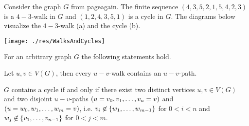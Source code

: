 \begin{exam}
Consider the graph $G$ from page\pageref{ex:Graph}again. The finite sequence $(4, 3, 5, 2, 1, 5, 4, 2, 3)$ is a $4-3$-walk in $G$ and $(1,2,4,3,5,1)$ is a cycle in $G$. The diagrams below visualize the $4-3$-walk (a) and the cycle (b).

\begin{center}
\texttt{[image: ./res/WalksAndCycles]}
%     
%     
%     
\end{center}
\end{exam}
\begin{lem} For an arbitrary graph $G$ the following statements hold. \label{thm:Unique Paths}
\begin{thmlist}
\item Let $u,v\in V(G)$, then every $u-v$-walk contains an $u-v$-path.\label{thm:Every walk contains a trail}
\item $G$ contains a cycle if and only if there exist two distinct vertices $u,v\in V(G)$ and two disjoint $u-v$-paths $(u=v_0,\seq{v}=v)$ and $(u=w_0,\seq[m]{w}=v)$, i.e. $v_i\not\in\lbrace\seq[m-1]{w}\rbrace$ for $0<i<n$ and $w_j\not\in\lbrace\seq[n-1]{v}\rbrace$ for $0<j<m$.
\end{thmlist}
\end{lem}
